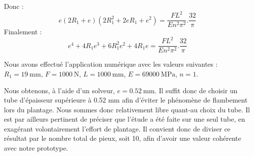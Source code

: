 \documentclass[../PS6_RapportFinal.tex]{subfiles}
\begin{document}
Donc :
\[e(2R_{1}+e)(2R_{1}^{2}+2eR_{1}+e^{2}) = \frac{FL^{2}}{En^{2}\pi^{2}}.\frac{32}{\pi}\]
Finalement :
\[e^{4}+4R_{1}e^{3}+6R_{1}^{2}e^{2}+4R_{1}e=\frac{FL^{2}}{En^{2}\pi^{2}}.\frac{32}{\pi}\]

Nous avons effectué l'application numérique avec les valeurs suivantes : $R_{1} = 19 \: \si{\milli\metre} $, $F = 1000 \: \si{\newton}$, $L = 1000 \: \si{\milli\metre}$, $E = 69000 \: \si{\mega\pascal}$, $n = 1$.

Nous obtenons, à l'aide d'un solveur, $e= \num{0.52} \: \si{\milli\metre}$. Il suffit donc de choisir un tube d'épaisseur supérieure à \num{0.52} \si{\milli\metre} afin d'éviter le phénomène de flambement lors du plantage. Nous sommes donc relativement libre quant-au choix du tube. Il est par ailleurs pertinent de préciser que l'étude a été faite sur une seul tube, en exagérant volontairement l'effort de plantage. Il convient donc de diviser ce résultat par le nombre total de pieux, soit 10, afin d'avoir une valeur cohérente avec notre prototype.
\end{document}
